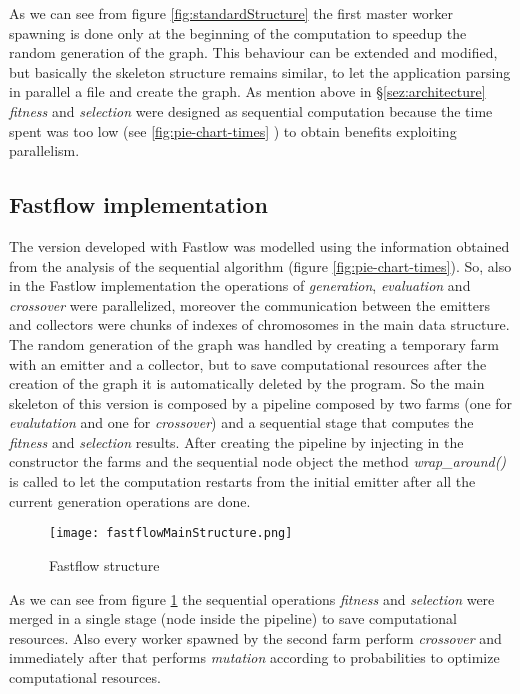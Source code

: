 As we can see from figure \ref{fig:standardStructure} the first master worker spawning is done only at the beginning of the computation to speedup the random generation of the graph. This behaviour can be extended and modified, but basically the skeleton structure remains similar, to let the application parsing in parallel a file and create the graph. As mention above in \S \ref{sez:architecture} \textit{fitness} and \textit{selection} were designed as sequential computation because the time spent was too low (see \ref{fig:pie-chart-times} ) to obtain benefits exploiting parallelism.
 
\subsection{Fastflow implementation}
The version developed with Fastlow \cite{fastflow} was modelled using the information obtained from the analysis of the sequential algorithm (figure \ref{fig:pie-chart-times}). So, also in the Fastlow implementation the operations of \textit{generation}, \textit{evaluation} and \textit{crossover} were parallelized, moreover the communication between the emitters and collectors were chunks of indexes of chromosomes in the main data structure. The random generation of the graph was handled by creating a temporary farm with an emitter and a collector, but to save computational resources after the creation of the graph it is automatically deleted by the program. So the main skeleton of this version is composed by a pipeline composed by two farms (one for \textit{evalutation} and one for \textit{crossover}) and a sequential stage that computes the \textit{fitness} and \textit{selection} results. After creating the pipeline by injecting in the constructor the farms and the sequential node object the method \textit{wrap\_around()} is called to let the computation restarts from the initial emitter after all the current generation operations are done. 

\vspace{1.5em}
\begin{figure}[h]
	\centering
	\texttt{[image: fastflowMainStructure.png]}
	\vspace{0.15em}
	\caption{Fastflow structure}
	\label{fig:fastflowStructure}
\end{figure}
\vspace{1em}

As we can see from figure \ref{fig:fastflowStructure} the sequential operations \textit{fitness} and \textit{selection} were merged in a single stage (node inside the pipeline) to save computational resources. Also every worker spawned by the second farm perform \textit{crossover} and immediately after that performs \textit{mutation} according to probabilities to optimize computational resources.

